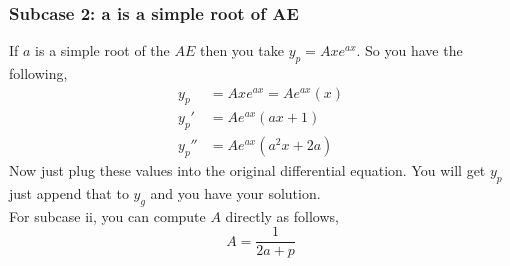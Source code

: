 \documentclass[oneside,11pt,pdftex,final]{book}%
\numberwithin{equation}{section}
\newtheorem{example}[theorem]{Example}
\numberwithin{section}{chapter}
\numberwithin{equation}{chapter}
\begin{document}

\subsubsection{Subcase 2: a is a simple root of AE}
If $ a $ is a simple root of the $ AE $ then you take $ y_p=Axe^{ax} $. So you have the following,
\begin{align*}
	y_p&=Axe^{ax}=Ae^{ax}(x)\\
	y_p'&=Ae^{ax}(ax+1)\\
	y_p''&=Ae^{ax}(a^2x+2a)
\end{align*}
Now just plug these values into the original differential equation. You will get $ y_p $ just append that to $ y_g $ and you have your solution.\\

For subcase ii, you can compute $ A $ directly as follows, \[ A=\frac{1}{2a+p} \]

\end{document}
